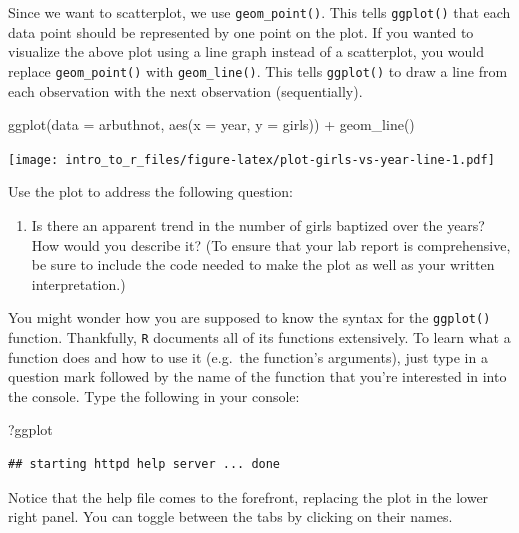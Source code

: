 \documentclass[
]{article}
\newenvironment{Shaded}{\begin{snugshade}}{\end{snugshade}}
\newcommand{\AttributeTok}[1]{\textcolor[rgb]{0.77,0.63,0.00}{#1}}
\newcommand{\FunctionTok}[1]{\textcolor[rgb]{0.00,0.00,0.00}{#1}}
\newcommand{\NormalTok}[1]{#1}
\newcommand{\SpecialCharTok}[1]{\textcolor[rgb]{0.00,0.00,0.00}{#1}}
\providecommand{\tightlist}{%
  \setlength{\itemsep}{0pt}\setlength{\parskip}{0pt}}
\begin{document}
Since we want to scatterplot, we use \texttt{geom\_point()}. This tells \texttt{ggplot()} that each data point should be represented by one point on the plot. If you wanted to visualize the above plot using a line graph instead of a scatterplot, you would replace \texttt{geom\_point()} with \texttt{geom\_line()}. This tells \texttt{ggplot()} to draw a line from each observation with the next observation (sequentially).

\begin{Shaded}
\begin{Highlighting}[]
\FunctionTok{ggplot}\NormalTok{(}\AttributeTok{data =}\NormalTok{ arbuthnot, }\FunctionTok{aes}\NormalTok{(}\AttributeTok{x =}\NormalTok{ year, }\AttributeTok{y =}\NormalTok{ girls)) }\SpecialCharTok{+}
  \FunctionTok{geom\_line}\NormalTok{()}
\end{Highlighting}
\end{Shaded}

\texttt{[image: intro\_to\_r\_files/figure-latex/plot-girls-vs-year-line-1.pdf]}

Use the plot to address the following question:

\begin{enumerate}
\def\labelenumi{\arabic{enumi}.}
\tightlist
\item
  Is there an apparent trend in the number of girls baptized over the years? How would you describe it? (To ensure that your lab report is comprehensive, be sure to include the code needed to make the plot as well as your written interpretation.)
\end{enumerate}

You might wonder how you are supposed to know the syntax for the \texttt{ggplot()} function. Thankfully, \texttt{R} documents all of its functions extensively. To learn what a function does and how to use it (e.g.~the function's arguments), just type in a question mark followed by the name of the function that you're interested in into the console. Type the following in your console:

\begin{Shaded}
\begin{Highlighting}[]
\NormalTok{?ggplot}
\end{Highlighting}
\end{Shaded}

\begin{verbatim}
## starting httpd help server ... done
\end{verbatim}

Notice that the help file comes to the forefront, replacing the plot in the lower right panel. You can toggle between the tabs by clicking on their names.
\end{document}
